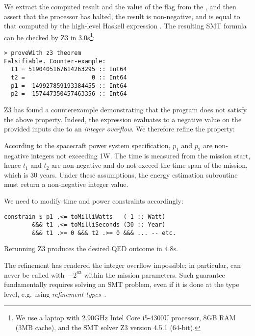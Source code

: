 \noindent
We extract the computed result and the value of the flag  from the
, and then assert that the processor has halted, the result is
non-negative, and is equal to that computed by the high-level Haskell expression
.
The resulting SMT formula can be checked by Z3 in
3.0s\footnote{We use a laptop with 2.90GHz Intel Core i5-4300U processor, 8GB
RAM (3MB cache), and the SMT solver Z3 version 4.5.1 (64-bit).}:

\begin{verbatim}
> proveWith z3 theorem
Falsifiable. Counter-example:
  t1 = 5190405167614263295 :: Int64
  t2 =                   0 :: Int64
  p1 =  149927859193384455 :: Int64
  p2 =  157447350457463356 :: Int64
\end{verbatim}

\noindent
Z3 has found a counterexample demonstrating that the program does not
satisfy the above property. Indeed, the expression evaluates to a negative
value on the provided inputs due to an \emph{integer overflow}. We therefore
refine the property:

\begin{tcolorbox}
According to the spacecraft power system specification, $p_1$ and $p_2$ are
non-negative integers not exceeding 1W. The time is measured
from the mission start, hence $t_1$ and $t_2$ are non-negative and do not exceed
the time span of the mission, which is 30 years. Under these assumptions,
the energy estimation subroutine must return a non-negative integer value.
\end{tcolorbox}

\noindent
We need to modify time and power constraints accordingly:

\begin{verbatim}
constrain $ p1 .<= toMilliWatts   ( 1 :: Watt)
        &&& t1 .<= toMilliSeconds (30 :: Year)
        &&& t1 .>= 0 &&& t2 .>= 0 &&& ... -- etc.
\end{verbatim}

\noindent
Rerunning Z3 produces the desired \textsf{QED} outcome in 4.8s.

The refinement has rendered the integer overflow impossible;
in particular,  can never be called with~$-2^{63}$
within the mission parameters. Such guarantee fundamentally requires
solving an SMT problem, even if it is done at the type level, e.g. using
\emph{refinement types}~\cite{vazou2014refinement}.

